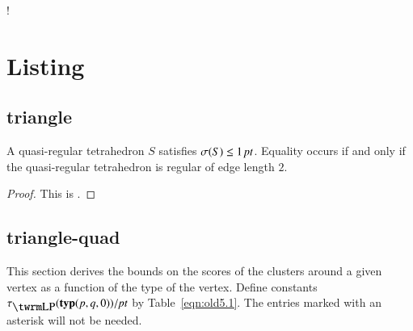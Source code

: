 !%




\section{Listing}

\subsection{triangle}


\begin{lemma} \label{lemma:1pt}
A quasi-regular tetrahedron $S$ satisfies $\sigma(S)\le 1\,\hbox{\it pt}$.
Equality occurs if and only if the quasi-regular tetrahedron is
regular of edge length $2$.
%
\end{lemma}

\begin{proof}
This is .
\end{proof}

\subsection{triangle-quad}



This section derives the bounds on the scores of the clusters
around a given vertex as a function of the type of the vertex.
Define constants $\tlp(\pqr{(p,q,0)})/\pt$ by Table~\ref{eqn:old5.1}.  The
entries marked with an asterisk will not be needed.

\bigskip



